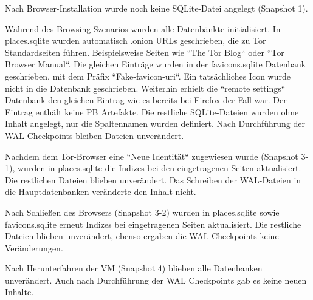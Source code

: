 \begin{appendices}
\begin{table}[h!]
{\begin{tabular}{|l|c|cc|cc|cc|cc|}
\end{tabular}
}
\end{table}
Nach Browser-Installation wurde noch keine SQLite-Datei angelegt (Snapshot 1).

Während des Browsing Szenarios wurden alle Datenbänkte initialisiert.
In places.sqlite wurden automatisch .onion URLs geschrieben, die zu Tor Standardseiten führen. Beispielsweise Seiten wie ``The Tor Blog`` oder ``Tor Browser Manual``.
Die gleichen Einträge wurden in der favicons.sqlite Datenbank geschrieben, mit dem Präfix ``Fake-favicon-uri``. Ein tatsächliches Icon wurde nicht in die Datenbank geschrieben. 
Weiterhin erhielt die ``remote settings`` Datenbank den gleichen Eintrag wie es bereits bei Firefox der Fall war. Der Eintrag enthält keine PB Artefakte.
Die restliche SQLite-Dateien wurden ohne Inhalt angelegt, nur die Spaltennamen wurden definiert.
Nach Durchführung der WAL Checkpoints bleiben Dateien unverändert.

Nachdem dem Tor-Browser eine ``Neue Identität`` zugewiesen wurde (Snapshot 3-1), wurden in places.sqlite die Indizes bei den eingetragenen Seiten aktualisiert. Die restlichen Dateien blieben unverändert. Das Schreiben der WAL-Dateien in die Hauptdatenbanken veränderte den Inhalt nicht.

Nach Schließen des Browsers (Snapshot 3-2) wurden in places.sqlite sowie favicons.sqlite erneut Indizes bei eingetragenen Seiten aktualisiert. Die restliche Dateien blieben unverändert, ebenso ergaben die WAL Checkpoints keine Veränderungen.

Nach Herunterfahren der VM (Snapshot 4) blieben alle Datenbanken unverändert. Auch nach Durchführung der WAL Checkpoints gab es keine neuen Inhalte.


\end{appendices}
